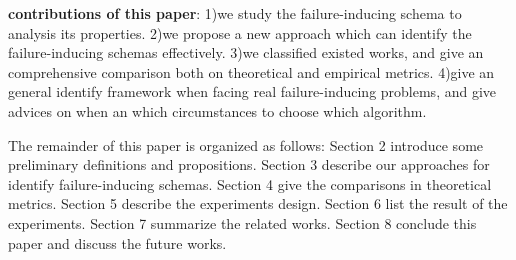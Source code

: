 \documentclass[10pt,journal,cspaper,compsoc]{IEEEtran}
\begin{document}
\textbf{contributions of this paper}:
1)we study the failure-inducing schema to analysis its properties.
2)we propose a new approach which can identify the failure-inducing schemas effectively.
3)we classified existed works, and give an comprehensive comparison both on theoretical and empirical metrics.
4)give an general identify framework when facing real failure-inducing problems, and give advices on when an which circumstances to choose which algorithm.

The remainder of this paper is organized as follows: Section 2 introduce some preliminary definitions and propositions. Section 3 describe our approaches for identify failure-inducing schemas. Section 4 give the comparisons in theoretical metrics. Section 5 describe the experiments design. Section 6 list the result of the experiments. Section 7 summarize the related works. Section 8 conclude this paper and discuss the future works.
%
%



%
%
\end{document}
